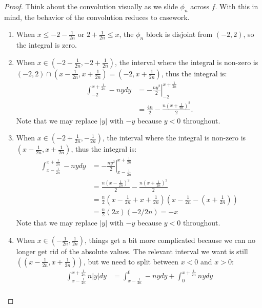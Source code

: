 \documentclass[12pt]{article}
\theoremstyle{remark}
\theoremstyle{named}
\begin{document}
\begin{proof}
    Think about the convolution visually as we slide \(\phi_n\) across \(f\). With this in mind, the behavior of the convolution reduces to casework.
    \begin{enumerate}
        \item When \(x \leq -2 - \frac{1}{2n}\) or \(2 + \frac{1}{2n} \leq x\), the \(\phi_n\) block is disjoint from \((-2, 2)\), so the integral is zero.
        \item When \(x \in (-2 - \frac{1}{2n}, -2 + \frac{1}{2n})\), the interval where the integral is non-zero is \((-2, 2) \cap (x - \frac{1}{2n}, x + \frac{1}{2n}) = (-2, x+\frac{1}{2n})\), thus the integral is:
        \begin{align*}
            \int_{-2}^{x+\frac{1}{2n}} -ny dy &= \left . -\frac{ny^2}{2}\right |_{-2}^{x+\frac{1}{2n}} \\
            &= \frac{4n}{2} - \frac{n(x + \frac{1}{2n})^2}{2}.
        \end{align*}
        Note that we may replace \(|y|\) with \(-y\) because \(y < 0\) throughout.
        \item When \(x \in (-2 + \frac{1}{2n}, -\frac{1}{2n})\), the interval where the integral is non-zero is \((x-\frac{1}{2n}, x+\frac{1}{2n})\), thus the integral is:
        \begin{align*}
            \int_{x-\frac{1}{2n}}^{x+\frac{1}{2n}} -ny dy &= \left . -\frac{ny^2}{2}\right |_{x-\frac{1}{2n}}^{x+\frac{1}{2n}} \\
            &= \frac{n(x - \frac{1}{2n})^2}{2} - \frac{n(x + \frac{1}{2n})^2}{2} \\
            &= \frac{n}{2}(x - \frac{1}{2n} + x + \frac{1}{2n})(x - \frac{1}{2n} - (x + \frac{1}{2n})) \\
            &= \frac{n}{2}(2x)(-2/2n) = -x
        \end{align*}
        Note that we may replace \(|y|\) with \(-y\) because \(y < 0\) throughout.
        \item When \(x \in (-\frac{1}{2n}, \frac{1}{2n})\), things get a bit more complicated because we can no longer get rid of the absolute values. The relevant interval we want is still \(((x - \frac{1}{2n}, x + \frac{1}{2n}))\), but we need to split between \(x < 0\) and \(x > 0\):
        \begin{align*}
            \int_{x - \frac{1}{2n}}^{x + \frac{1}{2n}} n|y|dy &= \int_{x - \frac{1}{2n}}^{0} -nydy + \int_{0}^{x + \frac{1}{2n}} ny dy \\

\end{align*}
\end{enumerate}
\end{proof}
\end{document}

